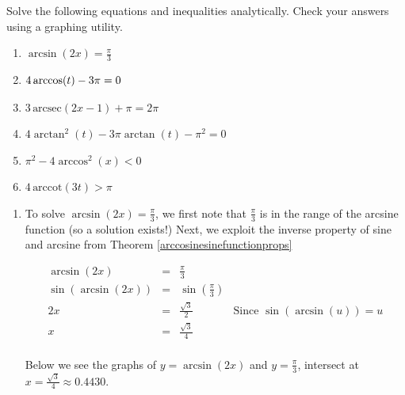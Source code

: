 \documentclass{ximera}
\begin{document}
\begin{example}  Solve the following equations and inequalities analytically.  Check your answers using a graphing utility.


\begin{enumerate}

\item  $\arcsin(2x) = \frac{\pi}{3}$

\item  $4\arccos(t)-3\pi = 0 \vphantom{\frac{\pi}{3}}$

\item  $3 \, \text{arcsec}(2x-1) + \pi = 2 \pi$

\item  $4\arctan^2(t)-3\pi \arctan(t)-\pi^2 = 0$

\item  $\pi^2-4\arccos^{2}(x) < 0$

\item  $4 \, \text{arccot}(3t) > \pi$

\end{enumerate}


\begin{explanation}

\begin{enumerate}

\item  To solve $\arcsin(2x) = \frac{\pi}{3}$, we first note that $\frac{\pi}{3}$ is in the range of the arcsine function (so a solution exists!) Next, we exploit the inverse property of sine and arcsine from Theorem \ref{arccosinesinefunctionprops}

\[ \begin{array}{rclr}

\arcsin(2x) & = & \frac{\pi}{3} & \\
\sin\left(\arcsin(2x)\right) & = & \sin\left(\frac{\pi}{3}\right) & \\
2x & = & \frac{\sqrt{3}}{2} & \text{Since $\sin(\arcsin(u)) = u$} \\
x & = & \frac{\sqrt{3}}{4} & \\ \end{array} \]

Below we see the graphs of  $y = \arcsin(2x)$ and $y = \frac{\pi}{3}$, intersect at $x = \frac{\sqrt{3}}{4} \approx 0.4430$.

\begin{center}
\end{center}


\end{enumerate}
\end{explanation}
\end{example}
\end{document}

